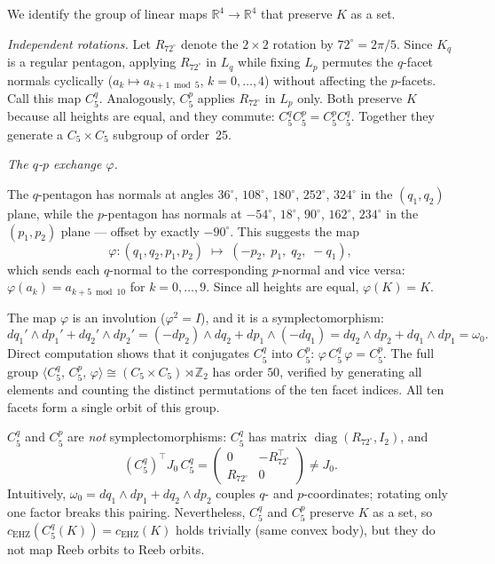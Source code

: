 We identify the group of linear maps $\mathbb{R}^4 \to \mathbb{R}^4$
that preserve $K$ as a set.

\emph{Independent rotations.}
Let $R_{72^\circ}$ denote the $2{\times}2$ rotation by $72^\circ = 2\pi/5$.
Since $K_q$ is a regular pentagon, applying $R_{72^\circ}$ in $L_q$
while fixing $L_p$ permutes the $q$-facet normals cyclically
($a_k \mapsto a_{k+1\bmod 5}$, $k = 0, \ldots, 4$)
without affecting the $p$-facets.
Call this map $C_5^q$.
Analogously, $C_5^p$ applies $R_{72^\circ}$ in $L_p$ only.
Both preserve $K$ because all heights are equal, and they commute:
$C_5^q C_5^p = C_5^p C_5^q$.
Together they generate a $C_5 \times C_5$ subgroup of order~25.

\emph{The $q$\nobreakdash-$p$ exchange $\varphi$.}
\begin{unverified}
The $q$-pentagon has normals at angles
$36^\circ$, $108^\circ$, $180^\circ$, $252^\circ$, $324^\circ$
in the $(q_1, q_2)$ plane, while the $p$-pentagon has normals at
$-54^\circ$, $18^\circ$, $90^\circ$, $162^\circ$, $234^\circ$
in the $(p_1, p_2)$ plane --- offset by exactly $-90^\circ$.
This suggests the map
\[
  \varphi \colon (q_1, q_2, p_1, p_2)
  \;\mapsto\; (-p_2,\; p_1,\; q_2,\; -q_1),
\]
which sends each $q$-normal to the corresponding $p$-normal and vice
versa: $\varphi(a_k) = a_{k+5\bmod 10}$ for $k = 0, \ldots, 9$.
Since all heights are equal, $\varphi(K) = K$.

The map $\varphi$ is an involution ($\varphi^2 = I$), and it is a
symplectomorphism:
\[
  dq_1' \wedge dp_1' + dq_2' \wedge dp_2'
  = (-dp_2) \wedge dq_2 + dp_1 \wedge (-dq_1)
  = dq_2 \wedge dp_2 + dq_1 \wedge dp_1
  = \omega_0.
\]
Direct computation shows that it conjugates $C_5^q$ into $C_5^p$:
$\varphi \, C_5^q \, \varphi = C_5^p$.
The full group
$\langle C_5^q,\, C_5^p,\, \varphi \rangle
\cong (C_5 \times C_5) \rtimes \mathbb{Z}_2$
has order $50$, verified by generating all elements and
counting the distinct permutations of the ten facet indices.
All ten facets form a single orbit of this group.
\end{unverified}

\begin{unverified}
\begin{remark}\label{rem:non-symplectic-rotations}
$C_5^q$ and $C_5^p$ are \emph{not} symplectomorphisms:
$C_5^q$ has matrix $\operatorname{diag}(R_{72^\circ}, I_2)$, and
\[
  (C_5^q)^\top J_0\, C_5^q
  = \begin{pmatrix} 0 & -R_{72^\circ}^\top \\ R_{72^\circ} & 0 \end{pmatrix}
  \neq J_0.
\]
Intuitively, $\omega_0 = dq_1 \wedge dp_1 + dq_2 \wedge dp_2$ couples
$q$- and $p$-coordinates; rotating only one factor breaks this pairing.
Nevertheless, $C_5^q$ and $C_5^p$ preserve $K$ as a set, so
$c_{\mathrm{EHZ}}(C_5^q(K)) = c_{\mathrm{EHZ}}(K)$
holds trivially (same convex body), but they do not map Reeb orbits
to Reeb orbits.
\end{remark}
\end{unverified}

